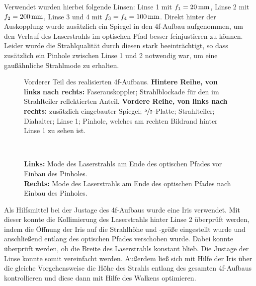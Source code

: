 Verwendet wurden hierbei folgende Linsen: Linse 1 mit $f_{1}=\unit[20]{mm}$, Linse 2 mit $f_{2}=\unit[200]{mm}$, Linse 3 und 4 mit $f_{3}=f_{4}=\unit[100]{mm}$. Direkt hinter der Auskopplung wurde zusätzlich ein Spiegel in den 4f-Aufbau aufgenommen, um den Verlauf des Laserstrahls im optischen Pfad besser feinjustieren zu können. Leider wurde die Strahlqualität durch diesen stark beeinträchtigt, so dass zusätzlich ein Pinhole zwischen Linse 1 und 2 notwendig war, um eine gaußähnliche Strahlmode zu erhalten.\\


\begin{figure}[h]
	\centering
	\caption[Vorderer Teil des 4f-Aufbaus]{
		Vorderer Teil des realisierten 4f-Aufbaus. \textbf{Hintere Reihe, von links nach rechts:} Faserauskoppler; Strahlblockade für den im Strahlteiler reflektierten Anteil. \textbf{Vordere Reihe, von links nach rechts:} zusätzlich eingebauter Spiegel; $\nicefrac{\lambda}{2}$-Platte; Strahlteiler; Diahalter; Linse 1; Pinhole, welches am rechten Bildrand hinter Linse 1 zu sehen ist.
	}
	\label{fig:_DSC7961}
\end{figure}

\begin{figure}[ht]
	\centering
	~
	\caption[Mode vor und nach Verwendung eines Pinholes]{
		\textbf{Links:} Mode des Laserstrahls am Ende des optischen Pfades vor Einbau des Pinholes.\\
		\textbf{Rechts:} Mode des Laserstrahls am Ende des optischen Pfades nach Einbau des Pinholes.
	}
	\label{fig:_DSC7988}
\end{figure}


Als Hilfsmittel bei der Justage des 4f-Aufbaus wurde eine Iris verwendet. Mit dieser konnte die Kollimierung des Laserstrahls hinter Linse 2 überprüft werden, indem die Öffnung der Iris auf die Strahlhöhe und -größe eingestellt wurde und anschließend entlang des optischen Pfades verschoben wurde. Dabei konnte überprüft werden, ob die Breite des Laserstrahls konstant blieb. Die Justage der Linse konnte somit vereinfacht werden. Außerdem ließ sich mit Hilfe der Iris über die gleiche Vorgehensweise die Höhe des Strahls entlang des gesamten 4f-Aufbaus kontrollieren und diese dann mit Hilfe des Walkens optimieren. 

\clearpage


